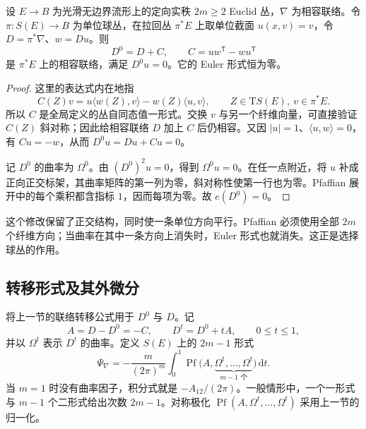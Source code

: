 \begin{lemma}\label{g3:lem:tautological-parallel-connection}
	设 \(E\to B\) 为光滑无边界流形上的定向实秩 \(2m\ge2\) Euclid 丛，\(\nabla\) 为相容联络。令 \(\pi:S(E)\to B\) 为单位球丛，在拉回丛 \(\pi^*E\) 上取单位截面 \(u(x,v)=v\)，令 \(D=\pi^*\nabla\)、\(w=Du\)。则
	\begin{equation}\label{g3:eq:tautological-parallel-connection}
		D^0=D+C,\qquad C=uw^{\mathsf T}-wu^{\mathsf T}
	\end{equation}
	是 \(\pi^*E\) 上的相容联络，满足 \(D^0u=0\)。它的 Euler 形式恒为零。
\end{lemma}
\begin{proof}
	这里的表达式内在地指
	\[
		C(Z)v=u\langle w(Z),v\rangle-w(Z)\langle u,v\rangle,
		\qquad Z\in\mathrm T S(E),\ v\in\pi^*E.
	\]
	所以 \(C\) 是全局定义的丛自同态值一形式。交换 \(v\) 与另一个纤维向量，可直接验证 \(C(Z)\) 斜对称；因此给相容联络 \(D\) 加上 \(C\) 后仍相容。又因 \(|u|=1\)、\(\langle u,w\rangle=0\)，有 \(Cu=-w\)，从而 \(D^0u=Du+Cu=0\)。

	记 \(D^0\) 的曲率为 \(\Omega^0\)。由 \((D^0)^2u=0\)，得到 \(\Omega^0u=0\)。在任一点附近，将 \(u\) 补成正向正交标架，其曲率矩阵的第一列为零，斜对称性使第一行也为零。Pfaffian 展开中的每个乘积都含指标 \(1\)，因而每项为零。故 \(e(D^0)=0\)。
\end{proof}

这个修改保留了正交结构，同时使一条单位方向平行。Pfaffian 必须使用全部 \(2m\) 个纤维方向；当曲率在其中一条方向上消失时，Euler 形式也就消失。这正是选择球丛的作用。

\subsection{转移形式及其外微分}
\label{g3:subsec:1702:02}
将上一节的联络转移公式用于 \(D^0\) 与 \(D\)。记
\[
	A=D-D^0=-C,\qquad D^t=D^0+tA,\qquad 0\le t\le1,
\]
并以 \(\Omega^t\) 表示 \(D^t\) 的曲率。定义 \(S(E)\) 上的 \(2m-1\) 形式
\begin{equation}\label{g3:eq:sphere-euler-transgression}
	\Psi_\nabla=-\frac{m}{(2\pi)^m}
	\int_0^1\operatorname{Pf}
	\bigl(A,\underbrace{\Omega^t,\ldots,\Omega^t}_{m-1\text{ 个}}\bigr)\,\mathrm dt.
\end{equation}
当 \(m=1\) 时没有曲率因子，积分式就是 \(-A_{12}/(2\pi)\)。一般情形中，一个一形式与 \(m-1\) 个二形式给出次数 \(2m-1\)。对称极化 \(\operatorname{Pf}(A,\Omega^t,\ldots,\Omega^t)\) 采用上一节的归一化。

